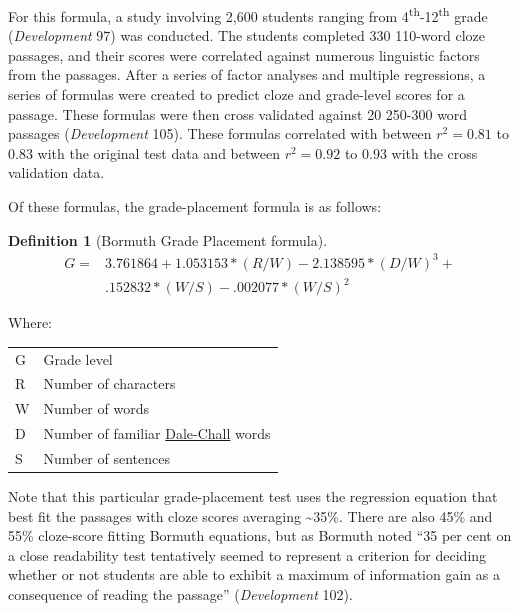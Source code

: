 \documentclass[
]{book}
\theoremstyle{definition}
\newtheorem{definition}{Definition}[chapter]
\theoremstyle{definition}
\theoremstyle{definition}
\theoremstyle{definition}
\theoremstyle{remark}
\begin{document}
For this formula, a study involving 2,600 students ranging from 4\textsuperscript{th}-12\textsuperscript{th} grade (\emph{Development} 97) was conducted. The students completed 330 110-word cloze passages, and their scores were correlated against numerous linguistic factors from the passages. After a series of factor analyses and multiple regressions, a series of formulas were created to predict cloze and grade-level scores for a passage. These formulas were then cross validated against 20 250-300 word passages (\emph{Development} 105). These formulas correlated with between \(r^2 = 0.81\) to \(0.83\) with the original test data and between \(r^2 = 0.92\) to \(0.93\) with the cross validation data.

Of these formulas, the grade-placement formula is as follows:

\begin{definition}[Bormuth Grade Placement formula]
\protect\hypertarget{def:bormuthgp}{}{\label{def:bormuthgp} {} }\begin{align*}
  G = & 3.761864 + 1.053153*(R/W) - 2.138595*(D/W)^3 + \\
      & .152832*(W/S) - .002077*(W/S)^2
\end{align*}
\end{definition}

Where:

\begin{longtable}[]{@{}
  >{\raggedright\arraybackslash}p{}
  >{\raggedright\arraybackslash}p{}@{}}
\toprule
\endhead
G & Grade level \\
R & Number of characters \\
W & Number of words \\
D & Number of familiar \protect\hyperlink{dale-chall-test}{Dale-Chall} words \\
S & Number of sentences \\
\bottomrule
\end{longtable}

Note that this particular grade-placement test uses the regression equation that best fit the passages with cloze scores averaging \textasciitilde35\%. There are also 45\% and 55\% cloze-score fitting Bormuth equations, but as Bormuth noted ``35 per cent on a close readability test tentatively seemed to represent a criterion for deciding whether or not students are able to exhibit a maximum of information gain as a consequence of reading the passage'' (\emph{Development} 102).
\end{document}
